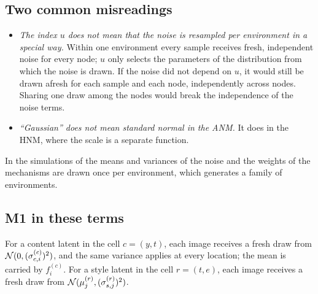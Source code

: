 \subsection{Two common misreadings}
\begin{itemize}[leftmargin=1.5em]
\item \emph{The index $u$ does not mean that the noise is resampled per environment in a special way.} Within
      one environment every sample receives fresh, independent noise for every node; $u$ only selects the
      parameters of the distribution from which the noise is drawn. If the noise did not depend on $u$, it
      would still be drawn afresh for each sample and each node, independently across nodes. Sharing one draw
      among the nodes would break the independence of the noise terms.
\item \emph{``Gaussian'' does not mean standard normal in the ANM.} It does in the HNM, where the scale is a
      separate function.
\end{itemize}
In the simulations of \cite{ng2025} the means and variances of the noise and the weights of the mechanisms are
drawn once per environment, which generates a family of environments.

\subsection{M1 in these terms}
For a content latent in the cell $c=(y,t)$, each image receives a fresh draw from
$\mathcal{N}(0,(\sigma_{c,i}^{(c)})^2)$, and the same variance applies at every location; the mean is carried by
$f_i^{(c)}$. For a style latent in the cell $r=(t,e)$, each image receives a fresh draw from
$\mathcal{N}(\mu_j^{(r)},(\sigma_{s,j}^{(r)})^2)$.
